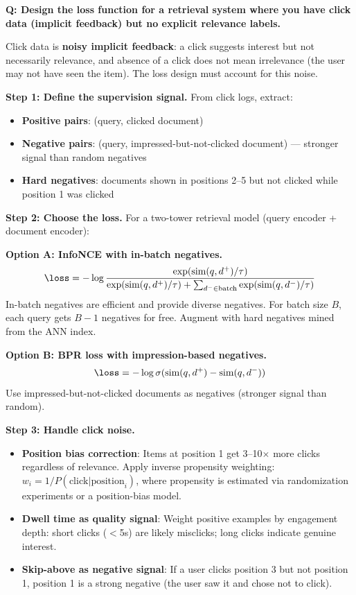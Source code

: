 \begin{interviewq}
\textbf{Q: Design the loss function for a retrieval system where you have click data (implicit feedback) but no explicit relevance labels.}

 \quad {} \quad \badgefreq{\freqhigh}

\stronganswer Click data is \textbf{noisy implicit feedback}: a click suggests interest but not necessarily relevance, and absence of a click does not mean irrelevance (the user may not have seen the item). The loss design must account for this noise.

\textbf{Step 1: Define the supervision signal.} From click logs, extract:
\begin{itemize}
    \item \textbf{Positive pairs}: (query, clicked document)
    \item \textbf{Negative pairs}: (query, impressed-but-not-clicked document) --- stronger signal than random negatives
    \item \textbf{Hard negatives}: documents shown in positions 2--5 but not clicked while position 1 was clicked
\end{itemize}

\textbf{Step 2: Choose the loss.} For a two-tower retrieval model (query encoder + document encoder):

\textbf{Option A: InfoNCE with in-batch negatives.}
$$\loss = -\log \frac{\exp(\text{sim}(q, d^+)/\tau)}{\exp(\text{sim}(q, d^+)/\tau) + \sum_{d^- \in \text{batch}} \exp(\text{sim}(q, d^-)/\tau)}$$
In-batch negatives are efficient and provide diverse negatives. For batch size $B$, each query gets $B-1$ negatives for free. Augment with hard negatives mined from the ANN index.

\textbf{Option B: BPR loss with impression-based negatives.}
$$\loss = -\log\sigma(\text{sim}(q, d^+) - \text{sim}(q, d^-))$$
Use impressed-but-not-clicked documents as negatives (stronger signal than random).

\textbf{Step 3: Handle click noise.}
\begin{itemize}
    \item \textbf{Position bias correction}: Items at position 1 get 3--10$\times$ more clicks regardless of relevance. Apply inverse propensity weighting: $w_i = 1/P(\text{click} | \text{position}_i)$, where propensity is estimated via randomization experiments or a position-bias model.
    \item \textbf{Dwell time as quality signal}: Weight positive examples by engagement depth: short clicks ($<$5s) are likely misclicks; long clicks indicate genuine interest.
    \item \textbf{Skip-above as negative signal}: If a user clicks position 3 but not position 1, position 1 is a strong negative (the user saw it and chose not to click).
\end{itemize}


\end{interviewq}
